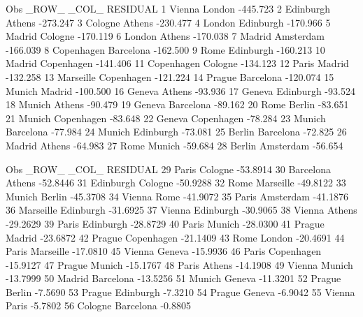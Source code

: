 \documentclass{article}
\begin{document}
\begin{Woutput}
Obs    _ROW_         _COL_         RESIDUAL
  1    Vienna        London        -445.723
  2    Edinburgh     Athens        -273.247
  3    Cologne       Athens        -230.477
  4    London        Edinburgh     -170.966
  5    Madrid        Cologne       -170.119
  6    London        Athens        -170.038
  7    Madrid        Amsterdam     -166.039
  8    Copenhagen    Barcelona     -162.500
  9    Rome          Edinburgh     -160.213
 10    Madrid        Copenhagen    -141.406
 11    Copenhagen    Cologne       -134.123
 12    Paris         Madrid        -132.258
 13    Marseille     Copenhagen    -121.224
 14    Prague        Barcelona     -120.074
 15    Munich        Madrid        -100.500
 16    Geneva        Athens         -93.936
 17    Geneva        Edinburgh      -93.524
 18    Munich        Athens         -90.479
 19    Geneva        Barcelona      -89.162
 20    Rome          Berlin         -83.651
 21    Munich        Copenhagen     -83.648
 22    Geneva        Copenhagen     -78.284
 23    Munich        Barcelona      -77.984
 24    Munich        Edinburgh      -73.081
 25    Berlin        Barcelona      -72.825
 26    Madrid        Athens         -64.983
 27    Rome          Munich         -59.684
 28    Berlin        Amsterdam      -56.654

Obs    _ROW_        _COL_         RESIDUAL
 29    Paris        Cologne       -53.8914
 30    Barcelona    Athens        -52.8446
 31    Edinburgh    Cologne       -50.9288
 32    Rome         Marseille     -49.8122
 33    Munich       Berlin        -45.3708
 34    Vienna       Rome          -41.9072
 35    Paris        Amsterdam     -41.1876
 36    Marseille    Edinburgh     -31.6925
 37    Vienna       Edinburgh     -30.9065
 38    Vienna       Athens        -29.2629
 39    Paris        Edinburgh     -28.8729
 40    Paris        Munich        -28.0300
 41    Prague       Madrid        -23.6872
 42    Prague       Copenhagen    -21.1409
 43    Rome         London        -20.4691
 44    Paris        Marseille     -17.0810
 45    Vienna       Geneva        -15.9936
 46    Paris        Copenhagen    -15.9127
 47    Prague       Munich        -15.1767
 48    Paris        Athens        -14.1908
 49    Vienna       Munich        -13.7999
 50    Madrid       Barcelona     -13.5256
 51    Munich       Geneva        -11.3201
 52    Prague       Berlin         -7.5690
 53    Prague       Edinburgh      -7.3210
 54    Prague       Geneva         -6.9042
 55    Vienna       Paris          -5.7802
 56    Cologne      Barcelona      -0.8805


\end{Woutput}
\end{document}

